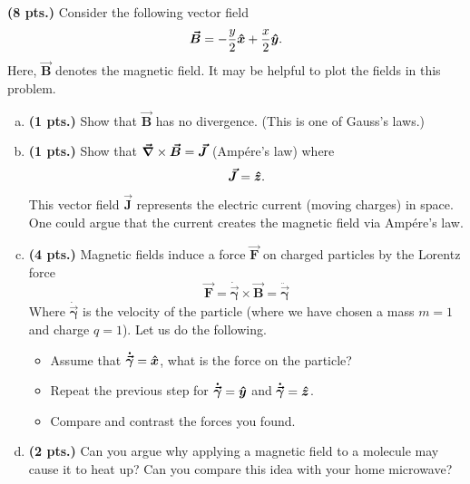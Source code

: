 \documentclass[12pt]{article} %
\newcommand{\tangentgamma}{\boldsymbol{\dot{\vec{\gamma}}}}
\newcommand{\normalgamma}{\boldsymbol{\ddot{\vec{\gamma}}}}
\newcommand{\vecfieldB}{\boldsymbol{\vec{B}}}
\newcommand{\vecfieldJ}{\boldsymbol{\vec{J}}}
\newcommand{\vecfieldF}{\boldsymbol{\vec{F}}}
\begin{document}
\begin{problem}
\textbf{(8 pts.)} Consider the following vector field
\[
\vecfieldB = -\frac{y}{2}\xhat + \frac{x}{2}\yhat.
\]
Here, $\vecfieldB$ denotes the magnetic field. It may be helpful to plot the fields in this problem.
\begin{enumerate}[(a)]
    \item \textbf{(1 pts.)} Show that $\vecfieldB$ has no divergence. (This is one of Gauss's laws.)
    \item \textbf{(1 pts.)} Show that $\grad \times \vecfieldB = \vecfieldJ$ (Amp\'ere's law) where
    \[
    \vecfieldJ = \zhat.
    \]
    This vector field $\vecfieldJ$ represents the electric current (moving charges) in space. One could argue that the current creates the magnetic field via Amp\'ere's law.
    \item \textbf{(4 pts.)} Magnetic fields induce a force $\vecfieldF$ on charged particles by the Lorentz force
    \[
    \vecfieldF = \tangentgamma \times \vecfieldB = \normalgamma
    \]
    Where $\tangentgamma$ is the velocity of the particle (where we have chosen a mass $m=1$ and charge $q=1$).  Let us do the following.
    \begin{itemize}
        \item Assume that $\tangentgamma = \xhat$, what is the force on the particle?
        \item Repeat the previous step for $\tangentgamma=\yhat$ and $\tangentgamma=\zhat$.
        \item Compare and contrast the forces you found.
    \end{itemize}
    \item \textbf{(2 pts.)} Can you argue why applying a magnetic field to a molecule may cause it to heat up? Can you compare this idea with your home microwave?
\end{enumerate}
\end{problem}
\end{document}
